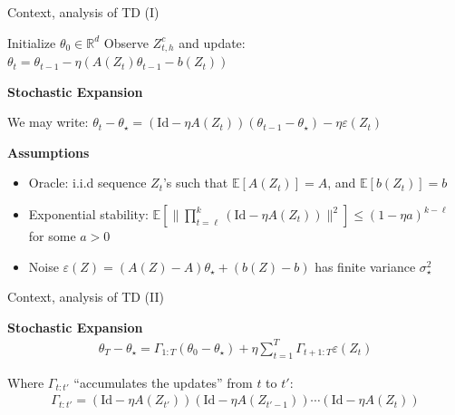 \documentclass[aspectratio=169,14pt]{beamer}
\begin{document}
\begin{frame}{Context, analysis of TD (I) }
  
  {\tiny
    \begin{algorithmic}
      \State Initialize $\theta_0 \in \mathbb{R}^d$
      \State Observe $Z^c_{t,h}$ and update: $\theta_{t} = \theta_{t-1} - \eta( A(Z_{t}) \theta_{t-1} - b(Z_{t}))$
      \EndFor
    \end{algorithmic}
  }

  \pause
  \vspace{-0.5em}
  
  \textbf{Stochastic Expansion}

  \vspace{-0.5em}

  We may write: $\theta_{t} - \theta_\star = (\text{Id} - \eta A(Z_t))(\theta_{t-1} - \theta_\star) - \eta \varepsilon(Z_t)$  

  \pause
  
  \textbf{Assumptions}

  \vspace{-0.5em}
  
  \begin{itemize}\setlength{\itemindent}{-1em}
    \small
  \item Oracle: i.i.d sequence $Z_{t}$'s such that
    $\mathbb{E} [A(Z_{t})] = A$, and
    $\mathbb{E} [b(Z_{t})] = b$
    
  \item Exponential stability: $\mathbb{E}[ \| \prod_{t=\ell}^k (\text{Id} - \eta A(Z_t)) \|^2 ] \le (1 - \eta a)^{k-\ell}$ for some $a > 0$

  \item Noise $\varepsilon(Z) = (A(Z) - A) \theta_\star + (b(Z) - b)$ has finite variance $\sigma_\star^2$
  \end{itemize}

  \vspace{1em}


\end{frame}


\begin{frame}[t]{Context, analysis of TD (II) }

  \textbf{Stochastic Expansion}
  \begin{align*}
    \theta_T - \theta_\star
    =
    \Gamma_{1:T} (\theta_0 - \theta_\star) + \eta \sum_{t=1}^T \Gamma_{t+1:T} \varepsilon(Z_t)
  \end{align*}

  Where $\Gamma_{t:t'}$ ``accumulates the updates'' from $t$ to $t'$:
  \begin{align*}
    \Gamma_{t:t'} = (\text{Id} - \eta A(Z_{t'})) (\text{Id} - \eta A(Z_{t'-1})) \cdots (\text{Id} - \eta A(Z_t))
  \end{align*}

  \vspace{1em}


\end{frame}
\end{document}
